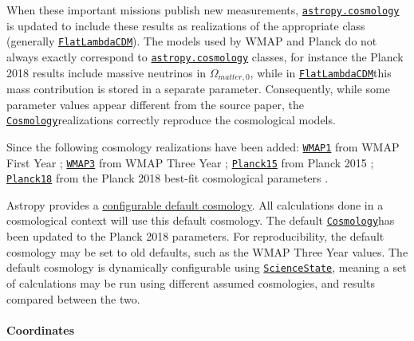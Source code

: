\documentclass[modern]{aastex631}
\newcommand{\astropysubpkg}[1]{\href{http://docs.astropy.org/en/stable/#1/index.html}{\texttt{astropy.#1}}\xspace}
\newcommand{\astropycosmology}{\astropysubpkg{cosmology}}
\newcommand{\astropyapi}[2]{\href{https://docs.astropy.org/en/stable/api/astropy.#1.html}{#2}}
\newcommand{\astropyapidoc}[2]{\astropyapi{#1}{\texttt{#2}\xspace}}
\newcommand{\astropyCosmology}{\astropyapidoc{cosmology.Cosmology}{Cosmology}}
\newcommand{\astropyFlatLambdaCDM}{\astropyapidoc{cosmology.FlatLambdaCDM}{FlatLambdaCDM}}
\newcommand{\astropyScienceState}{\astropyapidoc{utils.state.ScienceState}{ScienceState}}
\begin{document}
    When these important missions publish new measurements, \astropycosmology is
    updated to include these results as realizations of the appropriate class
    (generally \astropyFlatLambdaCDM). The models used by WMAP and Planck do not
    always exactly correspond to \astropycosmology classes, for instance the
    Planck 2018 results \citep{Planck2018VI} include massive neutrinos in
    $\Omega_{matter,0}$, while in \astropyFlatLambdaCDM this mass contribution is
    stored in a separate parameter. Consequently, while some parameter values
    appear different from the source paper, the \astropyCosmology realizations
    correctly reproduce the cosmological models.

    Since \citealt{astropy:2018} the following cosmology realizations have been
    added:
    \href{http://docs.astropy.org/en/stable/api/astropy.cosmology.WMAP1.html}{\texttt{WMAP1}}
    from WMAP First Year \citep[Table 7: WMAP + CBI + ACBAR + 2dFGRS +
    Lya]{WMAP1Year:2003};
    \href{http://docs.astropy.org/en/stable/api/astropy.cosmology.WMAP3.html}{\texttt{WMAP3}}
    from WMAP Three Year \citep[Table 6: WMAP + SNGold]{WMAP3Year:2007};
    \href{http://docs.astropy.org/en/stable/api/astropy.cosmology.Planck15.html}{\texttt{Planck15}}
    from Planck 2015 \citep[Table 4: TT, TE, EE + lowP + lensing +
    ext]{Planck2015XIII:2016};
    \href{http://docs.astropy.org/en/stable/api/astropy.cosmology.Planck18.html}{\texttt{Planck18}}
    from the Planck 2018 best-fit cosmological parameters \citep[Table 2: TT, TE,
    EE + lowE + lensing + BAO]{Planck2018VI:2020}.

    Astropy provides a
    \href{http://docs.astropy.org/en/stable/api/astropy.cosmology.default_cosmology.html}{configurable
    default cosmology}. All calculations done in a cosmological context will use
    this default cosmology. The default \astropyCosmology has been updated to the
    Planck 2018 parameters. For reproducibility, the default cosmology may be set
    to old defaults, such as the WMAP Three Year values. The default cosmology is
    dynamically configurable using \astropyScienceState, meaning a set of
    calculations may be run using different assumed cosmologies, and results
    compared between the two.

  \paragraph{Coordinates}
\end{document}
